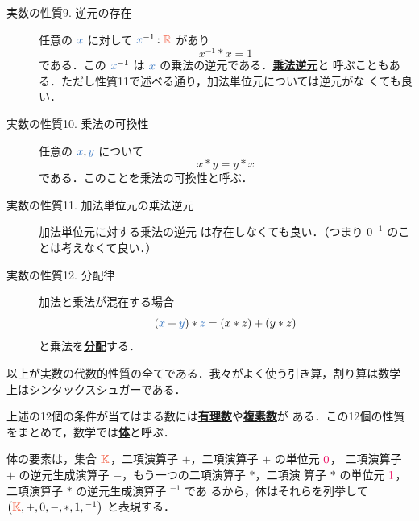 \documentclass[a5paper,twoside,fleqn,draft]{jsbook}
\def\constantColor{WildStrawberry}
\def\varColor{NavyBlue}
\def\typeColor{RedOrange}
\newcommand{\keyword}[1]{{\underline{\textbf{#1}}}}
\newcommand{\mConstant}[1]{\textcolor{\constantColor}{#1}}
\newcommand{\mZeroNumber}{{\mConstant{0}}}
\newcommand{\mOneNumber}{{\mConstant{1}}}
\newcommand{\mVar}[1]{\textcolor{\varColor}{#1}}
\newcommand{\mXVar}{\mVar{x}}
\newcommand{\mYVar}{\mVar{y}}
\newcommand{\mZVar}{\mVar{z}}
\DeclareMathOperator{\mIn}{{:\!:}}
\newcommand{\mSpecialSet}[1]{\textcolor{\typeColor}{\mathbb{#1}}}
\newcommand{\mKSet}{\mSpecialSet{K}}
\newcommand{\mRSet}{\mSpecialSet{R}}
\newcommand{\mTupleWith}[1]{\left(#1\right)}
\begin{document}
\begin{description}
\item[実数の性質9. 逆元の存在] 任意の $\mXVar$ に対して $\mXVar^{-1}\mIn\mRSet$
があり
\begin{equation}
x^{-1}*x=1
\end{equation}
である．この $\mXVar^{-1}$ は $\mXVar$ の乗法の逆元である．\keyword{乗法逆元}と
呼ぶこともある．ただし性質11で述べる通り，加法単位元については逆元がな
くても良い．
\item[実数の性質10. 乗法の可換性] 任意の $\mXVar,\mYVar$ について
\begin{equation}
x*y=y*x
\end{equation}
である．このことを乗法の可換性と呼ぶ．
\item[実数の性質11. 加法単位元の乗法逆元] 加法単位元に対する乗法の逆元
は存在しなくても良い．（つまり $0^{-1}$ のことは考えなくて良い．）
\item[実数の性質12. 分配律] 加法と乗法が混在する場合
\begin{equation}
(\mXVar+\mYVar)*\mZVar=(x*z)+(y*z)
\end{equation}
と乗法を\keyword{分配}する．
\end{description}
以上が実数の代数的性質の全てである．我々がよく使う引き算，割り算は数学
上はシンタックスシュガーである．

上述の12個の条件が当てはまる数には\keyword{有理数}や\keyword{複素数}が
ある．この12個の性質をまとめて，数学では\keyword{体}と呼ぶ．

体の要素は，集合 $\mKSet$，二項演算子 $+$，二項演算子 $+$ の単位元 $\mZeroNumber$，
二項演算子 $+$ の逆元生成演算子 $-$，もう一つの二項演算子 $*$，二項演
算子 $*$ の単位元 $\mOneNumber$，二項演算子 $*$ の逆元生成演算子 ${}^{-1}$ であ
るから，体はそれらを列挙して $\mTupleWith{\mKSet,+,0,-,*,1,{}^{-1}}$
と表現する．
\end{document}
